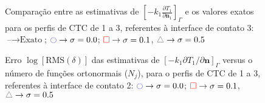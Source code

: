 \begin{figure}[h!b]
	\caption{Comparação entre as estimativas de $\left[-k_1 \frac{\partial T_1}{\partial\mathbf{n}_1}\right]_\Gamma$ e os valores exatos para os perfis de CTC de 1 a 3, referentes à interface de contato 3: $\text{--} \rightarrow \text{Exato}$; $\textcolor{blue}{\ocircle} \rightarrow \sigma = 0.0$; $\textcolor{red}{\square} \rightarrow \sigma = 0.1$, $\textcolor{gray}{\triangle} \rightarrow \sigma = 0.5$}
\end{figure}

\begin{figure}[h!b]
	\caption{Erro $\log[\text{RMS}(\delta)]$ das estimativas de $[-k_1 \partial T_1/\partial\mathbf{n}]_\Gamma$ versus o número de funções ortonormais ($N_j$), para o perfis de CTC de 1 a 3, referentes à interface de contato 2: $\textcolor{blue}{\ocircle} \rightarrow \sigma = 0.0$; $\textcolor{red}{\square} \rightarrow \sigma = 0.1$, $\textcolor{gray}{\triangle} \rightarrow \sigma = 0.5$}
\end{figure}

\begin{figure}[h!b]
\end{figure}







